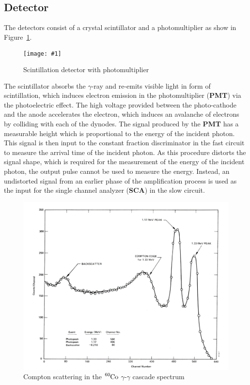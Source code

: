 \documentclass[twocolumn]{article}
\newcommand{\insertFigure}[1]{%
   \texttt{[image: \#1]}%
}
\begin{document}
\subsection{Detector}
The detectors consist of a crystal scintillator and a photomultiplier as show in Figure~\ref{fig:pmt}. \begin{figure}[!h]
	\centering
	\insertFigure{pmt.png}
	\caption{Scintillation detector with photomultiplier\cite{pmt}} 
	\label{fig:pmt}
\end{figure}
The scintillator absorbs the $\gamma$-ray and re-emits visible light in form of scintillation, which induces electron emission in the photomultiplier (\textbf{PMT}) via the photoelectric effect. The high voltage provided between the photo-cathode and the anode accelerates the electron, which induces an avalanche of electrons by colliding with each of the dynodes. The signal produced by the \textbf{PMT} has a measurable height which is proportional to the energy of the incident photon. This signal is then input to the constant fraction discriminator in the fast circuit to measure the arrival time of the incident photon. As this procedure distorts the signal shape, which is required for the measurement of the energy of the incident photon, the output pulse cannot be used to measure the energy. Instead, an undistorted signal from an earlier phase of the amplification process is used as the input for the single channel analyzer (\textbf{SCA}) in the slow circuit.
 \begin{figure}[!h]
 	\centering
 	\includegraphics[width=1\linewidth]{Compt.png}
 	\caption{Compton scattering in the $\ce{^{60}Co}$ $\gamma$-$\gamma$ cascade spectrum\cite{Compt}} 
 	\label{fig:Compt}
 \end{figure}
\end{document}
